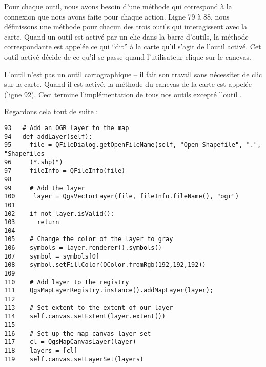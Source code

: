 Pour chaque outil, nous avons besoin d'une m\'ethode qui correspond \`a la connexion que nous avons faite pour chaque action. Ligne 79 \`a 88, nous d\'efinissons une m\'ethode pour chacun des trois outils qui interagissent avec la carte. Quand un outil est activ\'e par un clic dans la barre d'outils, la m\'ethode correspondante est appel\'ee ce qui ``dit'' \`a la carte qu'il s'agit de l'outil activ\'e. Cet outil activ\'e d\'ecide de ce qu'il se passe quand l'utilisateur clique sur le canevas.

L'outil  n'est pas un outil cartographique -- il fait son travail sans n\'ecessiter de clic sur la carte. Quand il est activ\'e, la m\'ethode  du canevas de la carte est appel\'ee (ligne 92). Ceci termine l'impl\'ementation de tous nos outils except\'e l'outil .

Regardons cela tout de suite :
\begin{verbatim}
93   # Add an OGR layer to the map
94   def addLayer(self):
95     file = QFileDialog.getOpenFileName(self, "Open Shapefile", ".", "Shapefiles
96     (*.shp)")
97     fileInfo = QFileInfo(file)
98 
99     # Add the layer
100     layer = QgsVectorLayer(file, fileInfo.fileName(), "ogr")
101
102    if not layer.isValid():
103      return
104
105    # Change the color of the layer to gray
106    symbols = layer.renderer().symbols()
107    symbol = symbols[0]
108    symbol.setFillColor(QColor.fromRgb(192,192,192))
109
110    # Add layer to the registry
111    QgsMapLayerRegistry.instance().addMapLayer(layer);
112
113    # Set extent to the extent of our layer
114    self.canvas.setExtent(layer.extent())
115
116    # Set up the map canvas layer set
117    cl = QgsMapCanvasLayer(layer)
118    layers = [cl]
119    self.canvas.setLayerSet(layers)
\end{verbatim}

